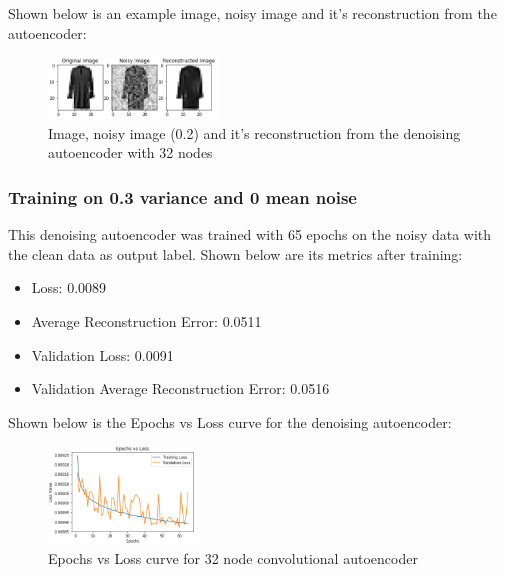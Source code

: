 \documentclass[conference]{IEEEtran}
\begin{document}
    Shown below is an example image, noisy image and it's reconstruction from the autoencoder:

    \begin{figure}[H]
        \centering
        \captionsetup{justification=centering}
        \centering
            \includegraphics[width=0.4\textwidth]{29.png}
            \caption{Image, noisy image (0.2) and it's reconstruction from the denoising autoencoder with 32 nodes}
    \end{figure}




    \subsubsection{Training on 0.3 variance and 0 mean noise\\}

    This denoising autoencoder was trained with 65 epochs on the noisy data with the clean data as output label. Shown below
    are its metrics after training:

    \begin{itemize}
        \item Loss: 0.0089
        \item Average Reconstruction Error: 0.0511
        \item Validation Loss: 0.0091
        \item Validation Average Reconstruction Error: 0.0516
    \end{itemize}

    Shown below is the Epochs vs Loss curve for the denoising autoencoder:

    \begin{figure}[H]
        \centering
        \captionsetup{justification=centering}
        \centering
            \includegraphics[width=0.35\textwidth]{30.png}
            \caption{Epochs vs Loss curve for 32 node convolutional autoencoder}
    \end{figure}
\end{document}

